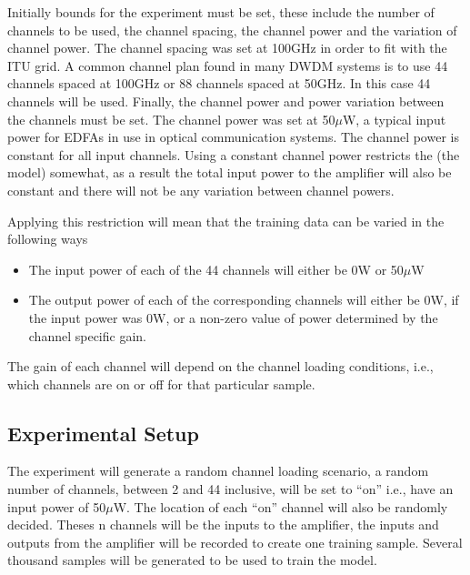 Initially bounds for the experiment must be set, these include the number of channels to be used, the channel spacing, the channel power and the variation of channel power.
The channel spacing was set at 100GHz in order to fit with the ITU grid. A common channel plan found in many DWDM systems is to use 44 channels spaced at 100GHz or 88 channels spaced at 50GHz. In this case 44 channels will be used.  Finally, the channel power and power variation between the channels must be set. The channel power was set at 50$\mu$W, a typical input power for EDFAs in use in optical communication systems. The channel power is constant for all input channels. Using a constant channel power restricts the (the model) somewhat, as a result the total input power to the amplifier will also be constant and there will not be any variation between channel powers. 

Applying this restriction will mean that the training data can be varied in the following ways

\begin{itemize}
    \item The input power of each of the 44 channels will either be 0W or 50$\mu$W\\
    
    \item The output power of each of the corresponding channels will either be 0W, if the input power was 0W, or a non-zero value of power determined by the channel specific gain.\\
\end{itemize}


The gain of each channel will depend on the channel loading conditions, i.e., which channels are on or off for that particular sample.



\subsection{Experimental Setup}


The experiment will generate a random channel loading scenario, a random number of channels, between 2 and 44 inclusive, will be set to “on” i.e., have an input power of 50$\mu$W. The location of each “on” channel will also be randomly decided. 
Theses n channels will be the inputs to the amplifier, the inputs and outputs from the amplifier will be recorded to create one training sample. Several thousand samples will be generated to be used to train the model. 

